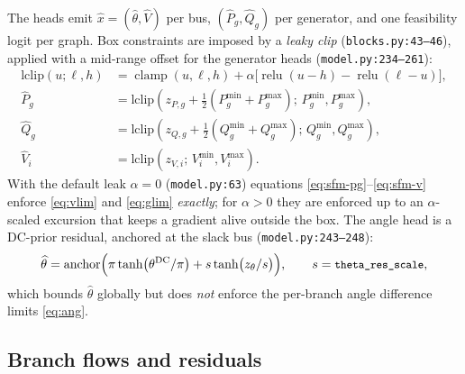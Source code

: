 \documentclass[11pt]{article}
\newcommand{\pred}[1]{\widehat{#1}}
\newcommand{\code}[1]{\texttt{\small #1}}
\newcommand{\relu}{\operatorname{relu}}
\begin{document}
The heads emit $\pred{x}=(\pred\theta,\pred{V})$ per bus, $(\pred{P}_g,\pred{Q}_g)$ per
generator, and one feasibility logit per graph. Box constraints are imposed by a
\emph{leaky clip} (\code{blocks.py:43--46}), applied with a mid-range offset for the
generator heads (\code{model.py:234--261}):
\begin{align}
\mathrm{lclip}(u;\ell,h)&=\operatorname{clamp}(u,\ell,h)+\alpha\Big[\relu(u-h)-\relu(\ell-u)\Big],
\label{eq:sfm-lclip}\\
\pred{P}_g&=\mathrm{lclip}\!\left(z_{P,g}+\tfrac12(P^{\min}_g+P^{\max}_g);\,P^{\min}_g,P^{\max}_g\right),
\label{eq:sfm-pg}\\
\pred{Q}_g&=\mathrm{lclip}\!\left(z_{Q,g}+\tfrac12(Q^{\min}_g+Q^{\max}_g);\,Q^{\min}_g,Q^{\max}_g\right),
\label{eq:sfm-qg}\\
\pred{V}_i&=\mathrm{lclip}\!\left(z_{V,i};\,V^{\min}_i,V^{\max}_i\right).
\label{eq:sfm-v}
\end{align}
With the default leak $\alpha=0$ (\code{model.py:63}) equations
\eqref{eq:sfm-pg}--\eqref{eq:sfm-v} enforce \eqref{eq:vlim} and \eqref{eq:glim}
\emph{exactly}; for $\alpha>0$ they are enforced up to an $\alpha$-scaled excursion that
keeps a gradient alive outside the box. The angle head is a DC-prior residual, anchored at
the slack bus (\code{model.py:243--248}):
\begin{equation}
\pred\theta = \operatorname{anchor}\!\Big(
\pi\tanh\!\big(\theta^{\mathrm{DC}}/\pi\big)
+ s\tanh\!\big(z_\theta/s\big)\Big),
\qquad s=\code{theta\_res\_scale},
\label{eq:sfm-theta}
\end{equation}
which bounds $\pred\theta$ globally but does \emph{not} enforce the per-branch angle
difference limits \eqref{eq:ang}.

\subsection{Branch flows and residuals}
\end{document}
